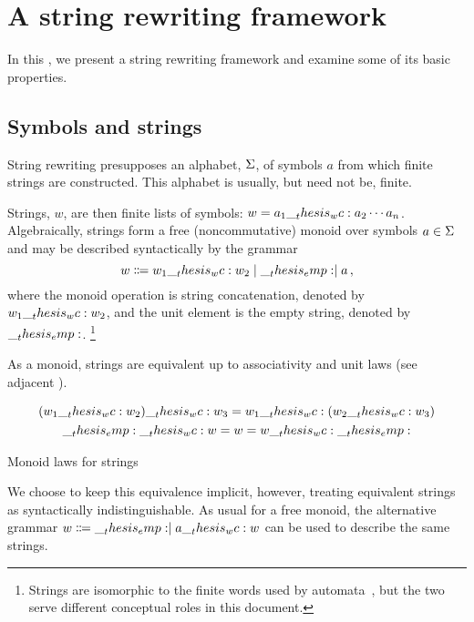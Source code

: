 \section{A string rewriting framework}\label{sec:string-rewriting:framework}

In this , we present a string rewriting framework and examine some of its basic properties.

\subsection{Symbols and strings}

String rewriting presupposes an alphabet, $\Sigma$, of symbols $a$ from which finite strings are constructed.
This alphabet is usually, but need not be, finite.

Strings, $w$, are then finite lists of symbols: $w = a_1 \wc a_2 \dotsb a_n$.
Algebraically, strings form a free (noncommutative) monoid over symbols $a \in \Sigma$ and may be described syntactically by the grammar
\begin{equation*}
  w \Coloneqq w_1 \wc w_2 \mid \emp \mid a
  \,,
\end{equation*}
where the monoid operation is string concatenation, denoted by $w_1 \wc w_2$, and the unit element is the empty string, denoted by $\__thesis_emp:$.%
\footnote[][-2.25\baselineskip]{Strings are isomorphic to the finite words used by automata~, but the two serve different conceptual roles in this document.}

As a monoid, strings are equivalent up to associativity and unit laws (see adjacent ).%
\begin{marginfigure}[0.5\baselineskip]
  \begin{gather*}
    (w_1 \wc w_2) \wc w_3 = w_1 \wc (w_2 \wc w_3) \\
    \emp \wc w = w = w \wc \emp
  \end{gather*}
  \caption{Monoid laws for strings}\label{fig:string-rewriting:monoid-laws}
\end{marginfigure}
We choose to keep this equivalence implicit, however, treating equivalent strings as syntactically indistinguishable.
As usual for a free monoid, the alternative grammar
    $w \Coloneqq \emp \mid a \wc w$
can be used to   describe the same strings.


